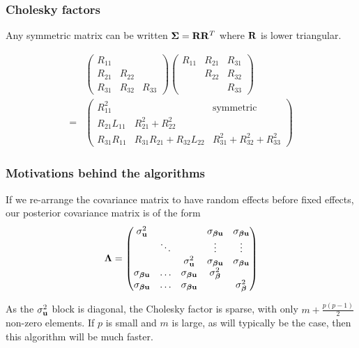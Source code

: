 \documentclass{beamer}
\begin{document}
\begin{frame}
\frametitle{Cholesky factors}
Any symmetric matrix can be written ${\boldsymbol \Sigma} = {\bf R} {\bf R}^T$
where ${\bf R}$ is lower triangular.

\begin{align*}
&\begin{pmatrix}
R_{11} \\
R_{21} & R_{22} \\
R_{31} & R_{32} & R_{33}
\end{pmatrix}
\begin{pmatrix}
R_{11} & R_{21} & R_{31} \\
& R_{22} & R_{32} \\
& & R_{33}
\end{pmatrix}
\\
=& \begin{pmatrix}
R_{11}^2 & & \text{symmetric}\\
R_{21}L_{11} & R_{21}^2 + R_{22}^2 \\
R_{31} R_{11} & R_{31}R_{21} + R_{32}L_{22} & R_{31}^2 + R_{32} ^2 + R_{33}^2
\end{pmatrix}
\end{align*}
\end{frame}

\begin{frame}
\frametitle{Motivations behind the algorithms}
If we re-arrange the covariance matrix to have random effects before
fixed effects, our posterior covariance matrix is of the form
\begin{align*} {\boldsymbol\Lambda} =
\begin{pmatrix}
\sigma_{\bf u}^2 & & & \sigma_{{\boldsymbol \beta} {\bf u}} & \sigma_{{\boldsymbol \beta} {\bf u}} \\
& \ddots & & \vdots & \vdots \\
& & \sigma_{\bf u}^2 & \sigma_{{\boldsymbol \beta} {\bf u}} & \sigma_{{\boldsymbol \beta} {\bf u}} \\
\sigma_{{\boldsymbol \beta} {\bf u}} & \ldots & \sigma_{{\boldsymbol \beta} {\bf u}} & \sigma_{\boldsymbol \beta}^2 \\
\sigma_{{\boldsymbol \beta} {\bf u}} & \ldots &\sigma_{{\boldsymbol \beta} {\bf u}}  & & \sigma_{\boldsymbol \beta}^2
\end{pmatrix}
\end{align*}

As the $\sigma_{\bf u}^2$ block is diagonal, the Cholesky factor is 
sparse, with only $m + \frac{p(p-1)}{2}$ non-zero elements. If $p$ is small
and $m$ is large, as will typically be the case, then this algorithm will
be much faster.

\end{frame}
\end{document}

